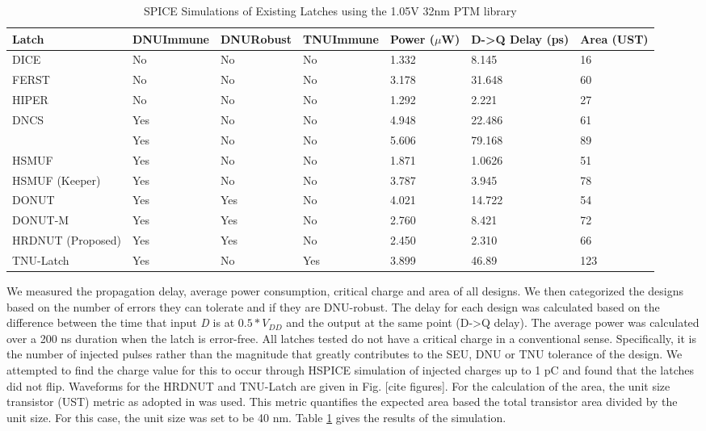 \begin{table}[t]
	\begin{center}
		\caption{SPICE Simulations of Existing Latches using the 1.05V 32nm PTM library }
		\label{table:rtable}
		\begin{tabular}{|m{7em}|m{3.5em}|m{3em}|m{3.5em}|m{2em}|m{3.5em}|m{2em}|}
			\hline
			Latch & DNU\newline Immune & DNU\newline Robust & TNU\newline Immune & Power ($\mu$W) & D-\textgreater Q Delay (ps) & Area (UST)\\ 
			\hline
			DICE & No & No & No & 1.332 & 8.145 & 16 \\
			\hline
			FERST & No & No & No & 3.178 & 31.648 & 60 \\
			\hline
			HIPER & No & No & No & 1.292 & 2.221 & 27 \\
			\hhline{|=|=|=|=|=|=|=|}
			DNCS & Yes & No & No & 4.948 & 22.486 & 61 \\
			\hline
			\cite{Inter} & Yes & No & No & 5.606 & 79.168 & 89 \\
			\hline
			HSMUF & Yes & No & No & 1.871 & 1.0626 & 51 \\
			\hline
			HSMUF (Keeper) & Yes & No & No & 3.787 & 3.945 & 78 \\
			\hhline{|=|=|=|=|=|=|=|}
			DONUT \cite{DONUT} & Yes & Yes & No & 4.021 & 14.722 & 54 \\ 
			\hline
			DONUT-M & Yes & Yes & No & 2.760 & 8.421 & 72\\
			\hline
			HRDNUT (Proposed) & Yes & Yes & No & 2.450 & 2.310 & 66 \\
			\hline
			TNU-Latch & Yes & No & Yes & 3.899 & 46.89 & 123 \\
			\hline
		\end{tabular}
	\end{center}
\end{table}
\raggedbottom

We measured the propagation delay, average power consumption, critical charge and area of all designs. We then categorized the designs based on the number of errors they can tolerate and if they are DNU-robust. The delay for each design was calculated based on the difference between the time that input \textit{D} is at $0.5*V_{DD}$ and the output at the same point (D-\textgreater Q delay). The average power was calculated over a 200 ns duration when the latch is error-free. All latches tested do not have a critical charge in a conventional sense. Specifically, it is the number of injected pulses rather than the magnitude that greatly contributes to the SEU, DNU or TNU tolerance of the design. We attempted to find the charge value for this to occur through HSPICE simulation of injected charges up to 1 pC and found that the latches did not flip. Waveforms for the HRDNUT and TNU-Latch are given in Fig. [cite figures]. For the calculation of the area, the unit size transistor (UST) metric as adopted in \cite{DNCS} was used. This metric quantifies the expected area based the total transistor area divided by the unit size. For this case, the unit size was set to be 40 nm. Table \ref{table:rtable} gives the results of the simulation.

